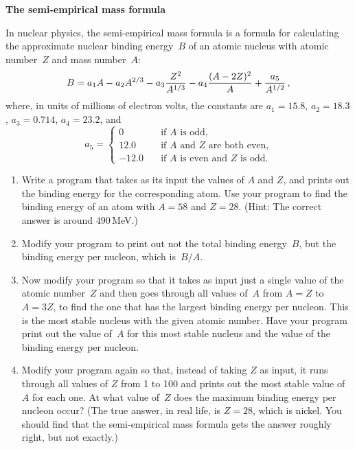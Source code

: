 \documentclass[12pt]{article}
\begin{document}
\begin{exercises}

\exercise \textbf{The semi-empirical mass formula}

\exskip In nuclear physics, the semi-empirical mass formula is a formula
for calculating the approximate nuclear binding energy~$B$ of an atomic
nucleus with atomic number~$Z$ and mass number~$A$:
\begin{displaymath}
B = a_1 A - a_2 A^{2/3} - a_3 {Z^2\over A^{1/3}}
    - a_4 {(A - 2Z)^2\over A} + {a_5\over A^{1/2}}\,,
\end{displaymath}
where, in units of millions of electron volts, the constants are
$a_1=15.8$, $a_2=18.3$, $a_3=0.714$, $a_4=23.2$, and
\begin{displaymath}
a_5 = \left\lbrace\begin{array}{ll}
      0     &\quad\mbox{if $A$ is odd,} \\
      12.0  &\quad\mbox{if $A$ and $Z$ are both even,} \\
      -12.0 &\quad\mbox{if $A$ is even and $Z$ is odd.}
      \end{array}\right.
\end{displaymath}
\begin{enumerate}\setlength{\itemsep}{0pt}
\item Write a program that takes as its input the values of $A$ and $Z$,
  and prints out the binding energy for the corresponding atom.  Use your
  program to find the binding energy of an atom with $A=58$ and $Z=28$.
  (Hint: The correct answer is around $490\,$MeV.)
\item Modify your program to print out not the total binding energy~$B$,
  but the binding energy per nucleon, which is~$B/A$.
\item Now modify your program so that it takes as input just a single value
  of the atomic number~$Z$ and then goes through all values of~$A$ from
  $A=Z$ to $A=3Z$, to find the one that has the largest binding energy per
  nucleon.  This is the most stable nucleus with the given atomic number.
  Have your program print out the value of~$A$ for this most stable nucleus
  and the value of the binding energy per nucleon.
\item Modify your program again so that, instead of taking $Z$ as input, it
  runs through all values of $Z$ from 1 to 100 and prints out the most
  stable value of $A$ for each one.  At what value of~$Z$ does the maximum
  binding energy per nucleon occur?  (The true answer, in real life, is
  $Z=28$, which is nickel.  You should find that the semi-empirical mass
  formula gets the answer roughly right, but not exactly.)
\end{enumerate}



\end{exercises}
\end{document}
